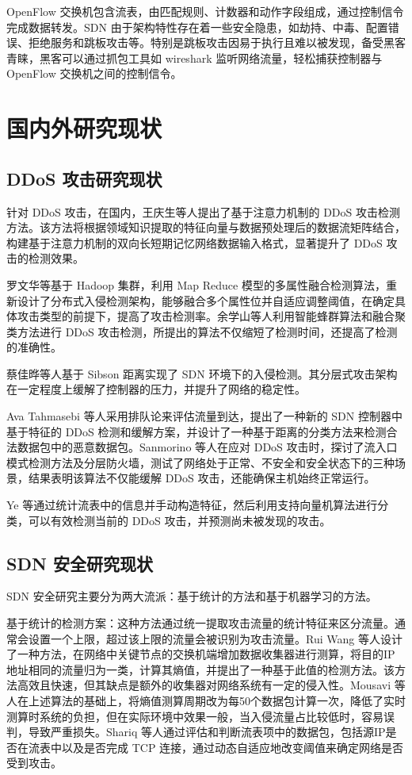 OpenFlow 交换机包含流表，由匹配规则、计数器和动作字段组成，通过控制信令完成数据转发。SDN 由于架构特性存在着一些安全隐患，如劫持、中毒、配置错误、拒绝服务和跳板攻击等。特别是跳板攻击因易于执行且难以被发现，备受黑客青睐，黑客可以通过抓包工具如 wireshark 监听网络流量，轻松捕获控制器与 OpenFlow 交换机之间的控制信令。
\section{国内外研究现状}
\subsection{DDoS 攻击研究现状}
针对 DDoS 攻击，在国内，王庆生等人提出了基于注意力机制的 DDoS 攻击检测方法。该方法将根据领域知识提取的特征向量与数据预处理后的数据流矩阵结合，构建基于注意力机制的双向长短期记忆网络数据输入格式，显著提升了 DDoS 攻击的检测效果。

罗文华等基于 Hadoop 集群，利用 Map Reduce 模型的多属性融合检测算法，重新设计了分布式入侵检测架构，能够融合多个属性位并自适应调整阈值，在确定具体攻击类型的前提下，提高了攻击检测率。余学山等人利用智能蜂群算法和融合聚类方法进行 DDoS 攻击检测，所提出的算法不仅缩短了检测时间，还提高了检测的准确性。

蔡佳晔等人基于 Sibson 距离实现了 SDN 环境下的入侵检测。其分层式攻击架构在一定程度上缓解了控制器的压力，并提升了网络的稳定性。

Ava Tahmasebi 等人采用排队论来评估流量到达，提出了一种新的 SDN 控制器中基于特征的 DDoS 检测和缓解方案，并设计了一种基于距离的分类方法来检测合法数据包中的恶意数据包。Sanmorino 等人在应对 DDoS 攻击时，探讨了流入口模式检测方法及分层防火墙，测试了网络处于正常、不安全和安全状态下的三种场景，结果表明该算法不仅能缓解 DDoS 攻击，还能确保主机始终正常运行。

Ye 等通过统计流表中的信息并手动构造特征，然后利用支持向量机算法进行分类，可以有效检测当前的 DDoS 攻击，并预测尚未被发现的攻击。
\subsection{SDN 安全研究现状}
SDN 安全研究主要分为两大流派：基于统计的方法和基于机器学习的方法。

基于统计的检测方案：这种方法通过统一提取攻击流量的统计特征来区分流量。通常会设置一个上限，超过该上限的流量会被识别为攻击流量。Rui Wang 等人设计了一种方法，在网络中关键节点的交换机端增加数据收集器进行测算，将目的IP地址相同的流量归为一类，计算其熵值，并提出了一种基于此值的检测方法。该方法高效且快速，但其缺点是额外的收集器对网络系统有一定的侵入性。Mousavi 等人在上述算法的基础上，将熵值测算周期改为每50个数据包计算一次，降低了实时测算时系统的负担，但在实际环境中效果一般，当入侵流量占比较低时，容易误判，导致严重损失。Shariq 等人通过评估和判断流表项中的数据包，包括源IP是否在流表中以及是否完成 TCP 连接，通过动态自适应地改变阈值来确定网络是否受到攻击。

